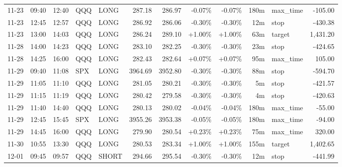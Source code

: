 \documentclass[11pt,a4paper,twoside]{article}
\begin{document}
\begin{center}
\begin{longtable}{>{\color{txtmain}}l l l l l r r r r r >{\color{txtmain}}l r}
11-23 & 09:40 & 12:40 & QQQ & LONG & 287.18 & 286.97 & \textcolor{lossred}{-0.07\%} & \textcolor{lossred}{-0.07\%} & 180m & max\_time & \textcolor{lossred}{-105.00} \\
11-23 & 12:45 & 12:57 & QQQ & LONG & 286.92 & 286.06 & \textcolor{lossred}{-0.30\%} & \textcolor{lossred}{-0.30\%} & 12m & stop & \textcolor{lossred}{-430.38} \\
11-23 & 13:00 & 14:03 & QQQ & LONG & 286.24 & 289.10 & \textcolor{wingreen}{+1.00\%} & \textcolor{wingreen}{+1.00\%} & 63m & target & \textcolor{wingreen}{1,431.20} \\
11-28 & 14:00 & 14:23 & QQQ & LONG & 283.10 & 282.25 & \textcolor{lossred}{-0.30\%} & \textcolor{lossred}{-0.30\%} & 23m & stop & \textcolor{lossred}{-424.65} \\
11-28 & 14:25 & 16:00 & QQQ & LONG & 282.43 & 282.64 & \textcolor{wingreen}{+0.07\%} & \textcolor{wingreen}{+0.07\%} & 95m & max\_time & \textcolor{wingreen}{105.00} \\
11-29 & 09:40 & 11:08 & SPX & LONG & 3964.69 & 3952.80 & \textcolor{lossred}{-0.30\%} & \textcolor{lossred}{-0.30\%} & 88m & stop & \textcolor{lossred}{-594.70} \\
11-29 & 11:05 & 11:10 & QQQ & LONG & 281.05 & 280.21 & \textcolor{lossred}{-0.30\%} & \textcolor{lossred}{-0.30\%} & 5m & stop & \textcolor{lossred}{-421.57} \\
11-29 & 11:15 & 11:19 & QQQ & LONG & 280.42 & 279.58 & \textcolor{lossred}{-0.30\%} & \textcolor{lossred}{-0.30\%} & 4m & stop & \textcolor{lossred}{-420.63} \\
11-29 & 11:40 & 14:40 & QQQ & LONG & 280.13 & 280.02 & \textcolor{lossred}{-0.04\%} & \textcolor{lossred}{-0.04\%} & 180m & max\_time & \textcolor{lossred}{-55.00} \\
11-29 & 12:45 & 15:45 & SPX & LONG & 3955.26 & 3953.38 & \textcolor{lossred}{-0.05\%} & \textcolor{lossred}{-0.05\%} & 180m & max\_time & \textcolor{lossred}{-94.00} \\
11-29 & 14:45 & 16:00 & QQQ & LONG & 279.90 & 280.54 & \textcolor{wingreen}{+0.23\%} & \textcolor{wingreen}{+0.23\%} & 75m & max\_time & \textcolor{wingreen}{320.00} \\
11-30 & 10:55 & 13:30 & QQQ & LONG & 280.53 & 283.34 & \textcolor{wingreen}{+1.00\%} & \textcolor{wingreen}{+1.00\%} & 155m & target & \textcolor{wingreen}{1,402.65} \\
12-01 & 09:45 & 09:57 & QQQ & SHORT & 294.66 & 295.54 & \textcolor{lossred}{-0.30\%} & \textcolor{lossred}{-0.30\%} & 12m & stop & \textcolor{lossred}{-441.99} \\

\end{longtable}
\end{center}
\end{document}
